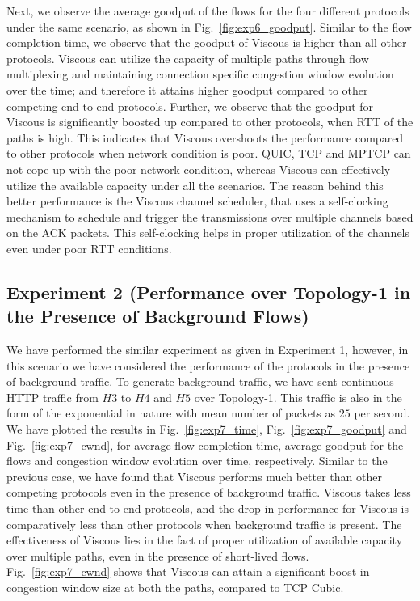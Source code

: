 Next, we observe the average goodput of the flows for the four different protocols under the same scenario, as shown in Fig.~\ref{fig:exp6_goodput}. Similar to the flow completion time, we observe that the goodput of Viscous is higher than all other protocols. Viscous can utilize the capacity of multiple paths through flow multiplexing and maintaining connection specific congestion window evolution over the time; and therefore it attains higher goodput compared to other competing end-to-end protocols. Further, we observe that the goodput for Viscous is significantly boosted up compared to other protocols, when RTT of the paths is high. This indicates that Viscous overshoots the performance compared to other protocols when network condition is poor. QUIC, TCP and MPTCP can not cope up with the poor network condition, whereas Viscous can effectively utilize the available capacity under all the scenarios. The reason behind this better performance is the Viscous channel scheduler, that uses a self-clocking mechanism to schedule and trigger the transmissions over multiple channels based on the ACK packets. This self-clocking helps in proper utilization of the channels even under poor RTT conditions. 


\subsection{Experiment 2 (Performance over Topology-1 in the Presence of Background Flows)}
We have performed the similar experiment as given in Experiment 1, however, in this scenario we have considered the performance of the protocols in the presence of  background traffic. To generate background traffic, we have sent continuous HTTP traffic from $H3$ to $H4$ and $H5$ over Topology-1. This traffic is also in the form of the exponential in nature with mean number of packets as $25$ per second. We have plotted the results in Fig.~\ref{fig:exp7_time}, Fig.~\ref{fig:exp7_goodput} and Fig.~\ref{fig:exp7_cwnd}, for average flow completion time, average goodput for the flows and congestion window evolution over time, respectively. Similar to the previous case, we have found that Viscous performs much better than other competing protocols even in the presence of background traffic. Viscous takes less time than other end-to-end protocols, and the drop in performance for Viscous is comparatively less than other protocols when background traffic is present. The effectiveness of Viscous lies in the fact of proper utilization of available capacity over multiple paths, even in the presence of short-lived flows. Fig.~\ref{fig:exp7_cwnd} shows that Viscous can attain a significant boost in congestion window size at both the paths, compared to TCP Cubic. 

